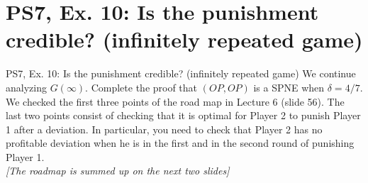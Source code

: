 \section{PS7, Ex. 10: Is the punishment credible? (infinitely repeated game)}

\begin{frame}{PS7, Ex. 10: Is the punishment credible? (infinitely repeated game)}
    We continue analyzing $G(\infty)$. Complete the proof that $(OP,OP)$ is a SPNE when $\delta=4/7$. We checked the first three points of the road map in Lecture 6 (slide 56). The last two points consist of checking that it is optimal for Player 2 to punish Player 1 after a deviation. In particular, you need to check that Player 2 has no profitable deviation when he is in the first and in the second round of punishing Player 1.\\\bigskip
    \textit{[The roadmap is summed up on the next two slides]}
    \vfill\null
\end{frame}
